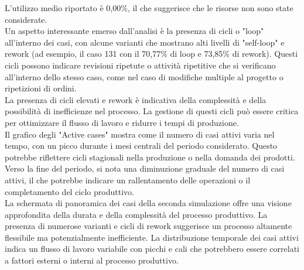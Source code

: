 \documentclass{article}
\begin{document}
L'utilizzo medio riportato è 0,00\%, il che suggerisce che le risorse non sono state considerate.\\
Un aspetto interessante emerso dall'analisi è la presenza di cicli o "loop" all'interno dei casi, con alcune varianti che mostrano alti livelli di "self-loop" e rework (ad esempio, il caso 131 con il 70,77\% di loop e 73,85\% di rework). Questi cicli possono indicare revisioni ripetute o attività ripetitive che si verificano all'interno dello stesso caso, come nel caso di modifiche multiple al progetto o ripetizioni di ordini.\\
La presenza di cicli elevati e rework è indicativa della complessità e della possibilità di inefficienze nel processo. La gestione di questi cicli può essere critica per ottimizzare il flusso di lavoro e ridurre i tempi di produzione.\\
Il grafico degli "Active cases" mostra come il numero di casi attivi varia nel tempo, con un picco durante i mesi centrali del periodo considerato. Questo potrebbe riflettere cicli stagionali nella produzione o nella domanda dei prodotti. Verso la fine del periodo, si nota una diminuzione graduale del numero di casi attivi, il che potrebbe indicare un rallentamento delle operazioni o il completamento del ciclo produttivo.\\
La schermata di panoramica dei casi della seconda simulazione offre una visione approfondita della durata e della complessità del processo produttivo. La presenza di numerose varianti e cicli di rework suggerisce un processo altamente flessibile ma potenzialmente inefficiente. La distribuzione temporale dei casi attivi indica un flusso di lavoro variabile con picchi e cali che potrebbero essere correlati a fattori esterni o interni al processo produttivo.\\
\end{document}
